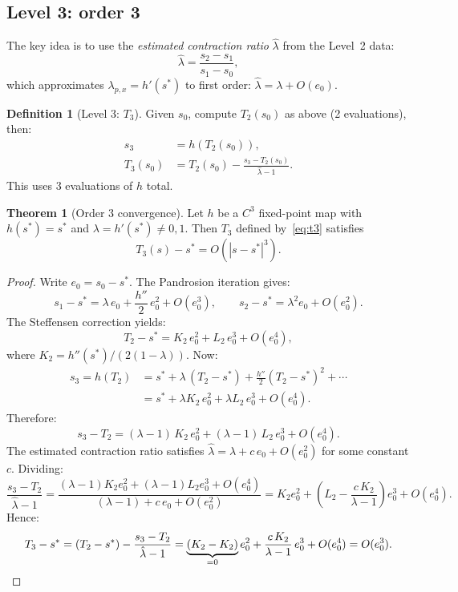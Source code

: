 \documentclass[11pt,a4paper]{article}
\theoremstyle{definition}
\newtheorem{definition}{Definition}[section]
\newtheorem{theorem}{Theorem}[section]
\begin{document}
\subsection{Level 3: order 3}

The key idea is to use the \emph{estimated contraction ratio} $\hat{\lambda}$ from the Level~2 data:
\begin{equation}
  \label{eq:lambda_hat}
  \hat{\lambda} = \frac{s_2 - s_1}{s_1 - s_0},
\end{equation}
which approximates $\lambda_{p,x} = h'(s^*)$ to first order: $\hat{\lambda} = \lambda + O(e_0)$.

\begin{definition}[Level 3: $T_3$]
\label{def:T3}
Given $s_0$, compute $T_2(s_0)$ as above (2 evaluations), then:
\begin{align}
  s_3 &= h(T_2(s_0)), \label{eq:t3_s3} \\
  T_3(s_0) &= T_2(s_0) - \frac{s_3 - T_2(s_0)}{\hat{\lambda} - 1}. \label{eq:t3}
\end{align}
This uses $3$ evaluations of $h$ total.
\end{definition}

\begin{theorem}[Order 3 convergence]
\label{thm:order3}
Let $h$ be a $C^3$ fixed-point map with $h(s^*) = s^*$ and $\lambda = h'(s^*) \neq 0, 1$.  Then $T_3$ defined by~\eqref{eq:t3} satisfies
\begin{equation}
  \label{eq:order3}
  T_3(s) - s^* = O(|s - s^*|^3).
\end{equation}
\end{theorem}

\begin{proof}
Write $e_0 = s_0 - s^*$.  The Pandrosion iteration gives:
\[
  s_1 - s^* = \lambda\, e_0 + \frac{h''}{2}\,e_0^2 + O(e_0^3),
  \qquad
  s_2 - s^* = \lambda^2 e_0 + O(e_0^2).
\]
The Steffensen correction yields:
\[
  T_2 - s^* = K_2 \, e_0^2 + L_2 \, e_0^3 + O(e_0^4),
\]
where $K_2 = h''(s^*)/(2(1-\lambda))$.  Now:
\begin{align*}
  s_3 = h(T_2) &= s^* + \lambda\,(T_2 - s^*) + \frac{h''}{2}(T_2 - s^*)^2 + \cdots \\
  &= s^* + \lambda K_2\, e_0^2 + \lambda L_2\, e_0^3 + O(e_0^4).
\end{align*}
Therefore:
\[
  s_3 - T_2 = (\lambda - 1)\, K_2\, e_0^2 + (\lambda - 1)\, L_2\, e_0^3 + O(e_0^4).
\]
The estimated contraction ratio satisfies $\hat{\lambda} = \lambda + c\, e_0 + O(e_0^2)$ for some constant $c$.  Dividing:
\[
  \frac{s_3 - T_2}{\hat{\lambda} - 1}
  = \frac{(\lambda - 1)K_2 e_0^2 + (\lambda - 1)L_2 e_0^3 + O(e_0^4)}{(\lambda - 1) + c\,e_0 + O(e_0^2)}
  = K_2 e_0^2 + \left(L_2 - \frac{c\,K_2}{\lambda - 1}\right) e_0^3 + O(e_0^4).
\]
Hence:
\[
  T_3 - s^* = (T_2 - s^*) - \frac{s_3 - T_2}{\hat{\lambda} - 1}
  = \underbrace{(K_2 - K_2)}_{=0} e_0^2 + \frac{c\,K_2}{\lambda - 1}\, e_0^3 + O(e_0^4)
  = O(e_0^3). \qedhere
\]
\end{proof}
\end{document}
